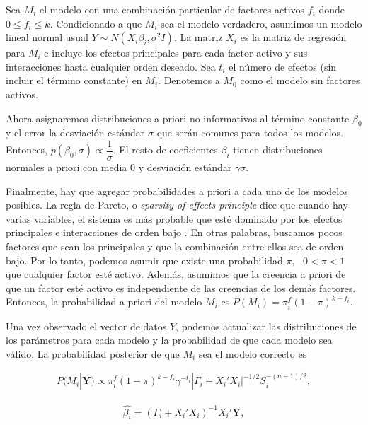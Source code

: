 Sea $M_i$ el modelo con una combinación particular de factores activos $f_i$ donde $0 \leq f_i \leq k$. Condicionado a que $M_i$ sea el modelo verdadero, asumimos un modelo lineal normal usual $\textbf{$Y$} \sim N(X_i \beta_i, \sigma^2 I).$ La matriz $X_i$ es la matriz de regresión para $M_i$ e incluye los efectos principales para cada factor activo y sus interacciones hasta cualquier orden deseado. Sea $t_i$ el número de efectos (sin incluir el término constante) en $M_i$. Denotemos a $M_0$ como el modelo sin factores activos. 

Ahora asignaremos distribuciones a priori no informativas al término constante $\beta_0$ y el error la desviación estándar $\sigma$ que serán comunes para todos los modelos. Entonces, $p( \beta_0, \sigma) \propto \dfrac{1}{\sigma}$. El resto de coeficientes $\beta_i$ tienen distribuciones normales a priori con media 0 y desviación estándar $\gamma \sigma$. 

Finalmente, hay que agregar probabilidades a priori a cada uno de los modelos posibles. La regla de Pareto, o \textit{sparsity of effects principle} dice que cuando hay varias variables, el sistema es más probable que esté dominado por los efectos principales e interacciones de orden bajo \cite{montgomery2017design}. En otras palabras, buscamos pocos factores que sean los principales y que la combinación entre ellos sea de orden bajo. Por lo tanto, podemos asumir que existe una probabilidad $\pi, \text{ } 0 < \pi < 1$ que cualquier factor esté activo. Además, asumimos que la creencia a priori de que un factor esté activo es independiente de las creencias de los demás factores. Entonces, la probabilidad a priori del modelo $M_i$ es $P(M_i) = \pi ^f_i (1 - \pi)^{k-f_i}.$ 

Una vez observado el vector de datos \textbf{$Y$}, podemos actualizar las distribuciones de los parámetros para cada modelo y la probabilidad de que cada modelo sea válido. La probabilidad posterior de que $M_i$ sea el modelo correcto es 

\begin{equation*}
	\begin{aligned}
		P(M_i | \textbf{Y}) \propto  \pi ^f_i (1 - \pi)^{k-f_i} \gamma^{-t_i} |\Gamma_i + X_i' X_i |^{-1/2} S_i^{-(n-1)/2}, 		
	\end{aligned}
\end{equation*}

\begin{equation} \label{betai}
	\begin{aligned}
		\hat{\beta_i} = (\Gamma_i + X_i' X_i)^{-1} X_i ' \textbf{Y}, 
	\end{aligned}
\end{equation}

